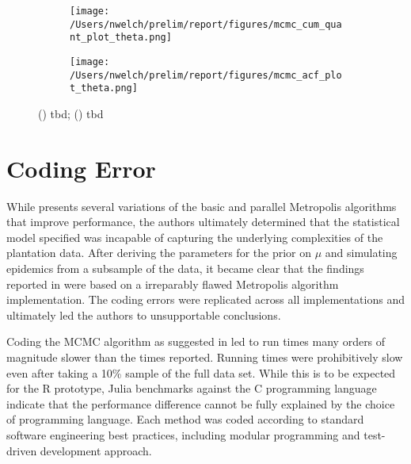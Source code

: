 \documentclass{uwstat572}
\begin{document}
\begin{figure}[H]
	\centering
	\begin{subfigure}[b]{0.49\textwidth}
		\texttt{[image: /Users/nwelch/prelim/report/figures/mcmc\_cum\_quant\_plot\_theta.png]}
		\caption{}
		\label{fig:quant_theta}
	\end{subfigure}
	\hfill
	\begin{subfigure}[b]{0.49\textwidth}
		\texttt{[image: /Users/nwelch/prelim/report/figures/mcmc\_acf\_plot\_theta.png]}
		\caption{}
		\label{fig:acf_theta}
	\end{subfigure}
	\caption{() tbd; () tbd }
	\label{fig:data_plot}
\end{figure} 

\newpage
\section{Coding Error}
\label{coding_error}

While \citet{Brown} presents several variations of the basic and parallel Metropolis algorithms that improve performance, the authors ultimately determined that the statistical model specified was incapable of capturing the underlying complexities of the plantation data. 
After deriving the parameters for the prior on $\mu$ and simulating epidemics from a subsample of the data, it became clear that the findings reported in \citet{Brown} were based on a irreparably flawed Metropolis algorithm implementation. 
The coding errors were replicated across all implementations and ultimately led the authors to unsupportable conclusions.

Coding the MCMC algorithm as suggested in \citet{Brown} led to run times many orders of magnitude slower than the times reported. 
Running times were prohibitively slow even after taking a 10\% sample of the full data set. 
While this is to be expected for the R prototype, Julia benchmarks against the C programming language indicate that the performance difference cannot be fully explained by the choice of programming language. 
Each method was coded according to standard software engineering best practices, including modular programming and test-driven development approach.  
\end{document}
